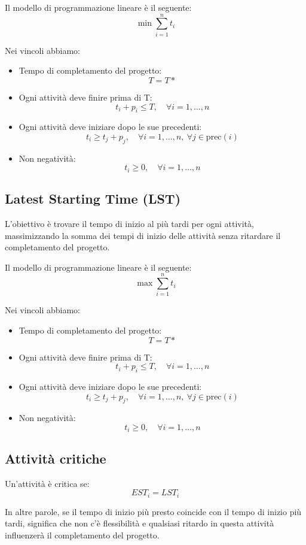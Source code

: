 Il modello di programmazione lineare è il seguente:
\[ 
\min \sum_{i=1}^n t_i
\]

Nei vincoli abbiamo:
\begin{itemize}
    \item Tempo di completamento del progetto:
    \[T = T*\]
    \item Ogni attività deve finire prima di T:
    \[t_i + p_i \leq T, \quad \forall i = 1,\ldots,n\]
    \item Ogni attività deve iniziare dopo le sue precedenti:
    \[t_i \geq t_j + p_j, \quad \forall i = 1,\ldots,n,\ \forall j \in \text{prec}(i)\]
    \item Non negatività:
    \[t_i \geq 0, \quad \forall i = 1,\ldots,n\]
\end{itemize}

\subsection{Latest Starting Time (LST)}
L'obiettivo è trovare il tempo di inizio al più tardi per ogni attività, 
massimizzando la somma dei tempi di inizio delle attività senza ritardare il 
completamento del progetto.

Il modello di programmazione lineare è il seguente:
\[ 
\max \sum_{i=1}^n t_i
\]

Nei vincoli abbiamo:
\begin{itemize}
    \item Tempo di completamento del progetto:
    \[T = T*\]
    \item Ogni attività deve finire prima di T:
    \[t_i + p_i \leq T, \quad \forall i = 1,\ldots,n\]
    \item Ogni attività deve iniziare dopo le sue precedenti:
    \[t_i \geq t_j + p_j, \quad \forall i = 1,\ldots,n,\ \forall j \in \text{prec}(i)\]
    \item Non negatività:
    \[t_i \geq 0, \quad \forall i = 1,\ldots,n\]
\end{itemize}

\subsection{Attività critiche}
Un'attività è critica se:
\[ 
EST_i = LST_i
\]

In altre parole, se il tempo di inizio più presto coincide con il tempo di inizio più tardi,
significa che non c'è flessibilità e qualsiasi ritardo in questa attività influenzerà il completamento del progetto.